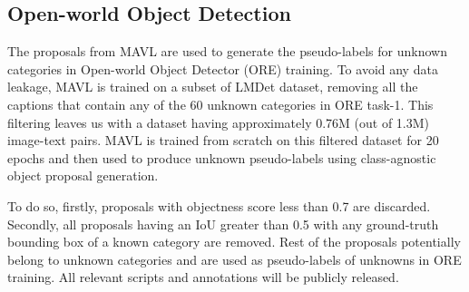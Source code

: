 \documentclass[runningheads]{llncs}
\begin{document}
\subsection{Open-world Object Detection}
\label{appendix:ore}
The proposals from MAVL are used to generate the pseudo-labels for unknown categories in Open-world Object Detector (ORE) \cite{joseph2021towards} training. To avoid any data leakage, MAVL is trained on a subset of LMDet dataset, removing all the captions that contain any of the 60 unknown categories in ORE task-1. This filtering leaves us with a dataset having approximately 0.76M (out of 1.3M) image-text pairs. MAVL is trained from scratch on this filtered dataset for 20 epochs and then used to produce unknown pseudo-labels using class-agnostic object proposal generation.

To do so, firstly, proposals with objectness score less than 0.7 are discarded. Secondly, all proposals having an IoU greater than 0.5 with any ground-truth bounding box of a known category are removed. Rest of the proposals potentially belong to unknown categories and are used as pseudo-labels of unknowns in ORE training. All relevant scripts and annotations will be publicly released.
\end{document}
